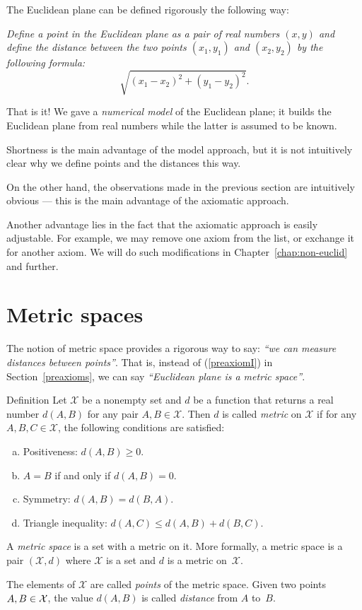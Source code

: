 The Euclidean plane can be defined rigorously the following way:

\textit{Define a {}\emph{point} in the Euclidean plane as a pair of real numbers $(x,y)$ and define the {}\emph{distance} between the two points $(x_1,y_1)$ and $(x_2,y_2)$ by the following formula:}
\[\sqrt{(x_1-x_2)^2+(y_1-y_2)^2}.\]

That is it!
We gave a {}\emph{numerical model} of the Euclidean plane;
it builds the Euclidean plane from real numbers
while the latter is assumed to be known.

Shortness is the main advantage of the model approach,
but it is not intuitively clear why we define points and the distances this way.

On the other hand, the observations made in the previous section are intuitively obvious ---
this is the main advantage of the axiomatic approach.

Another advantage lies in the fact that the axiomatic approach is easily adjustable. 
For example, we may remove one axiom from the list,
or exchange it for another axiom. 
We will do such modifications in Chapter~\ref{chap:non-euclid} and further.

\section{Metric spaces}

The notion of metric space provides 
a rigorous way to say: \textit{``we can measure distances between points''}.
That is, instead of (\ref{preaxiomI}) in Section~\ref{preaxioms},
we can say \textit{``Euclidean plane is a metric space''}.

\begin{thm}{Definition}\label{def:metric-space}
Let $\mathcal X$ be a nonempty set and 
$d$ be a function
that returns a real number $d(A,B)$
for any pair $A,B\in\mathcal X$.
Then $d$
is called \emph{metric} on 
$\mathcal X$ if for any
$A,B,C\in \mathcal X$, the following conditions are satisfied:
\begin{enumerate}[(a)]
\item\label{def:metric-space:a} Positiveness: 
$d(A,B)\ge 0.$
\item\label{def:metric-space:b} $A=B$ if and only if 
$d(A,B)=0.$
\item\label{def:metric-space:c} Symmetry: $d(A, B) = d(B, A).$
\item\label{def:metric-space:d} Triangle inequality: 
$d(A, C) \le d(A, B) + d(B, C).$
\end{enumerate}
A \emph{metric space} is a set with a metric on it. 
More formally, a metric space is a pair $(\mathcal X, d)$ where $\mathcal X$ is a set and $d$ is a metric on~$\mathcal X$.

The elements of $\mathcal X$ are called \emph{points} of the metric space.
Given two points $A,B\z\in \mathcal X$, 
the value $d(A, B)$ is called \emph{distance} from $A$ to~$B$.
\end{thm}

